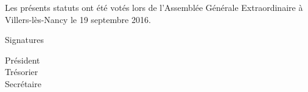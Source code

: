 \documentclass{article} %
\begin{document}
	\vspace*{5cm}
	\begin{center}
		{\large\light Les présents statuts ont été votés lors de l’Assemblée Générale
		Extraordinaire à Villers-lès-Nancy le 19 septembre 2016.}
	\end{center}
    \vspace{3cm}
	Signatures\par
	\begin{multicols}{3}
	    \begin{center}
	        Président \\
	        Trésorier \\
	        Secrétaire
	    \end{center}
	\end{multicols}
    
\end{document}
